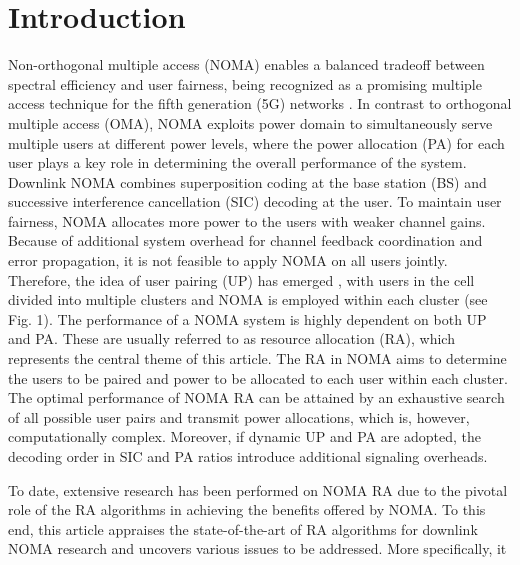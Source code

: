 \documentclass[10pt,final,journal,a4paper,twoside,twocolumn,romanappendices]{IEEEtran}
\theoremstyle{myremark}
\theoremstyle{myremark}
\begin{document}
%
\IEEEpeerreviewmaketitle


\section{Introduction}
Non-orthogonal multiple access (NOMA) enables a balanced tradeoff between spectral efficiency and user fairness, being recognized as a promising multiple access technique for the fifth generation (5G) networks \cite{3, 34, focus}. In contrast to orthogonal multiple access (OMA), NOMA exploits power domain to simultaneously serve multiple users at different power levels, where the power allocation (PA) for each user plays a key role in determining the overall performance of the system. Downlink NOMA combines superposition coding at the base station (BS) and successive interference cancellation (SIC) decoding at the user. To maintain user fairness, NOMA allocates more power to the users with weaker channel gains. Because of additional system overhead for channel feedback coordination and error propagation, it is not feasible to apply NOMA on all users jointly. Therefore, the idea of user pairing (UP) has emerged \cite{19}, with users in the cell divided into multiple clusters and NOMA is employed within each cluster (see Fig. 1). The performance of a NOMA system is highly dependent on both UP and PA. These are usually referred to as resource allocation (RA), which represents the central theme of this article. The RA in NOMA aims to determine the users to be paired and power to be allocated to each user within each cluster. The optimal performance of NOMA RA can be attained by an exhaustive search of all possible user pairs and transmit power allocations, which is, however, computationally complex. Moreover, if dynamic UP and PA are adopted, the decoding order in SIC and PA ratios introduce additional signaling overheads.

To date, extensive research has been performed on NOMA RA due to the pivotal role of the RA algorithms in achieving the benefits offered by NOMA. To this end, this article appraises the state-of-the-art of RA algorithms for downlink NOMA research and uncovers various issues to be addressed. More specifically, it
\end{document}
